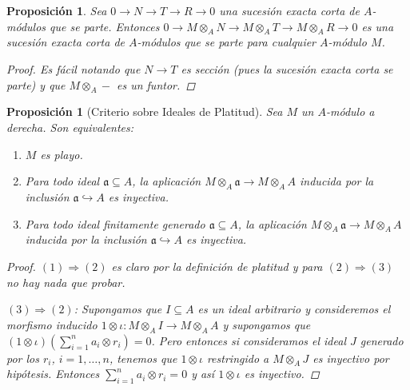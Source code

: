 \documentclass[12pt]{book}
\newtheorem{prop}[teo]{Proposición}
\theoremstyle{definition}
\begin{document}
\begin{prop}
Sea $0\longrightarrow N\longrightarrow T\longrightarrow R\longrightarrow 0$ una sucesión exacta corta de $A$-módulos que se parte. Entonces $0\longrightarrow M\otimes_A N\longrightarrow M\otimes_A T\longrightarrow M\otimes_A R\longrightarrow 0$ es una sucesión exacta corta de $A$-módulos que se parte para cualquier $A$-módulo $M$.
\begin{proof}
Es fácil notando que $N\longrightarrow T$ es sección (pues la sucesión exacta corta se parte) y que $M\otimes_A -$ es un funtor.
\end{proof}
\end{prop}

\begin{prop}[Criterio sobre Ideales de Platitud]
Sea $M$ un $A$-módulo a derecha. Son equivalentes:
\begin{enumerate}
\item $M$ es playo.
\item Para todo ideal $\mathfrak{a}\subseteq A$, la aplicación $M\otimes_A \mathfrak{a} \to M\otimes_A A$ inducida por la inclusión $\mathfrak{a}\hookrightarrow A$ es inyectiva.
\item Para todo ideal finitamente generado $\mathfrak{a}\subseteq A$, la aplicación $M\otimes_A \mathfrak{a}\to M\otimes_A A$ inducida por la inclusión $\mathfrak{a}\hookrightarrow A$ es inyectiva.
\end{enumerate}
\begin{proof}
$(1)\Longrightarrow (2)$ es claro por la definición de platitud y para $(2)\Longrightarrow (3)$ no hay nada que probar.

$(3)\Longrightarrow (2)$: Supongamos que $I\subseteq A$ es un ideal arbitrario y consideremos el morfismo inducido $1\otimes\iota :M\otimes_A I\to M\otimes_A A$ y supongamos que $(1\otimes \iota)\left(\displaystyle\sum_{i=1}^n a_i\otimes r_i\right) = 0$. Pero entonces si consideramos el ideal $J$ generado por los $r_i$, $i=1,\ldots , n$, tenemos que $1\otimes \iota$ restringido a $M\otimes_A J$ es inyectivo por hipótesis. Entonces $\displaystyle\sum_{i=1}^n a_i\otimes r_i = 0$ y así $1\otimes \iota$ es inyectivo.


\end{proof}
\end{prop}
\end{document}

